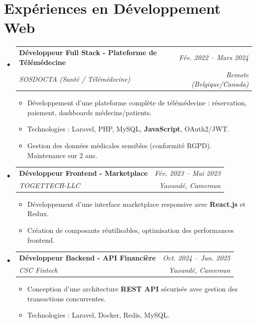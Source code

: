\documentclass[a4paper,11pt]{article}
\makeatletter
\newcommand{\resumeSubheading}[4]{
  \vspace{-1pt}\item
    \begin{tabular*}{0.97\textwidth}[t]{l@{\extracolsep{\fill}}r}
      \textbf{#1} & \textit{\small #2} \\
      \textit{\small #3} & \textit{\small #4} \\
    \end{tabular*}\vspace{-5pt}
}
\makeatother
\begin{document}
\section{Expériences en Développement Web}
\begin{itemize}[leftmargin=*, label={-}]

    \resumeSubheading
      {Développeur Full Stack - Plateforme de Télémédecine}{Fév. 2022 -- Mars 2024}
      {SOSDOCTA (Santé / Télémédecine)}{Remote (Belgique/Canada)}
      \begin{itemize}[leftmargin=0.4cm, nosep, label=\tiny$\bullet$]
        \item \small{Développement d'une plateforme complète de télémédecine : réservation, paiement, dashboards médecins/patients.}
        \item \small{Technologies : Laravel, PHP, MySQL, \textbf{JavaScript}, OAuth2/JWT.}
        \item \small{Gestion des données médicales sensibles (conformité RGPD). Maintenance sur 2 ans.}
      \end{itemize}
    \vspace{2pt}

    \resumeSubheading
      {Développeur Frontend - Marketplace}{Fév. 2023 -- Mai 2023}
      {TOGETTECH-LLC}{Yaoundé, Cameroun}
      \begin{itemize}[leftmargin=0.4cm, nosep, label=\tiny$\bullet$]
        \item \small{Développement d'une interface marketplace responsive avec \textbf{React.js} et Redux.}
        \item \small{Création de composants réutilisables, optimisation des performances frontend.}
      \end{itemize}
    \vspace{2pt}

    \resumeSubheading
      {Développeur Backend - API Financière}{Oct. 2024 -- Jan. 2025}
      {CSC Fintech}{Yaoundé, Cameroun}
      \begin{itemize}[leftmargin=0.4cm, nosep, label=\tiny$\bullet$]
        \item \small{Conception d'une architecture \textbf{REST API} sécurisée avec gestion des transactions concurrentes.}
        \item \small{Technologies : Laravel, Docker, Redis, MySQL.}
      \end{itemize}

\end{itemize}
\end{document}
